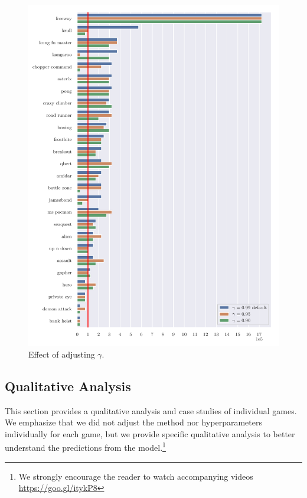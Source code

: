 \begin{figure}
\centering
\includegraphics[width=0.9\columnwidth]{figures/graph_Effect_of_adjusting_Gamma.pdf}
\caption{Effect of adjusting $\gamma$.} 
\label{fig:adj_gamma}
\end{figure}


\subsection{Qualitative Analysis}\label{qualitative_analysis}
This section provides a qualitative analysis and case studies of individual games. We emphasize that we did not adjust the method nor hyperparameters individually for each game, but we provide specific qualitative analysis to better understand the predictions from the model.\footnote{We strongly encourage the reader to watch accompanying videos \url{https://goo.gl/itykP8}} 

